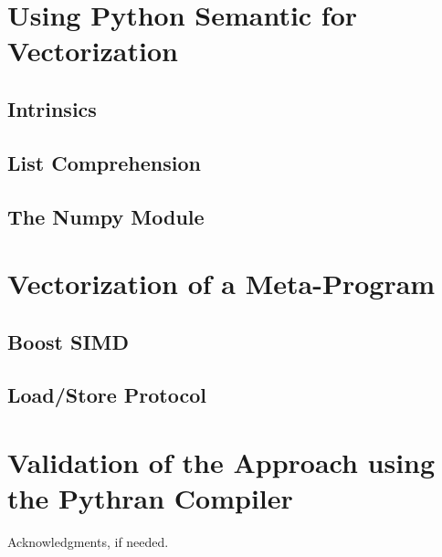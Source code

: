 \documentclass[preprint]{sigplanconf}
\begin{document}
\section{Using Python Semantic for Vectorization}
\label{sec:python-semantic}

\subsection{Intrinsics}

\subsection{List Comprehension}

\subsection{The Numpy Module}

\section{Vectorization of a Meta-Program}
\label{sec:meta-vectorization}

\subsection{Boost SIMD}

\subsection{Load/Store Protocol}

\section{Validation of the Approach using the Pythran Compiler}
\label{sec:benchs}

\acks

Acknowledgments, if needed.

\cite{*}



\end{document}
